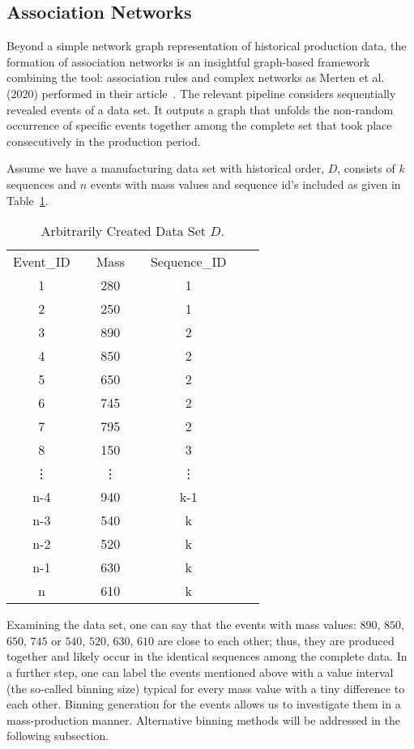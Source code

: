 \subsection*{Association Networks}
%
Beyond a simple network graph representation of historical production data, the formation of association networks is an insightful graph-based framework combining the tool: association rules and complex networks as Merten et al. (2020) performed in their article~\cite{MERTEN2020}. The relevant pipeline considers sequentially revealed events of a data set. It outputs a graph that unfolds the non-random occurrence of specific events together among the complete set that took place consecutively in the production period.

Assume we have a manufacturing data set with historical order, $D$, consists of $k$ sequences and $n$ events with mass values and sequence id's included as given in Table~\ref{Tab:D-dataset}.
\renewcommand{\arraystretch}{1.1}
\begin{table}[hb!]
	\centering
	\begin{tabular}{|cccccc|l}
		\cline{1-6}
		Event\_ID && Mass 	&& Sequence\_ID &  \\ \cline{1-6}
		1 	      && 280  	&& 1 		   	&  \\
		2 		  && 250	&& 1 		   	&  \\
		3 	      && 890	&& 2 		    &  \\
		4 		  && 850	&& 2 		    &  \\
		5 	      && 650	&& 2   		    &  \\
		6 	      && 745	&& 2 		    &  \\
		7 		  && 795	&& 2 		    &  \\
		8 		  && 150	&& 3 		    &  \\
		\vdots	  && \vdots && \vdots 	    &  \\
		n-4 	  && 940  	&& k-1	 	    &  \\
		n-3 	  && 540  	&& k			&  \\
		n-2 	  && 520	&& k 		    &  \\
		n-1       && 630	&& k 		    &  \\
		n 		  && 610	&& k 		    &  \\ \cline{1-6}
	\end{tabular}
	\caption{Arbitrarily Created Data Set $D$.}
	\label{Tab:D-dataset}
\end{table}

Examining the data set, one can say that the events with mass values: $890$, $850$, $650$, $745$ or $540$, $520$, $630$, $610$ are close to each other; thus, they are produced together and likely occur in the identical sequences among the complete data. In a further step, one can label the events mentioned above with a value interval (the so-called binning size) typical for every mass value with a tiny difference to each other. Binning generation for the events allows us to investigate them in a mass-production manner. Alternative binning methods will be addressed in the following subsection. 


